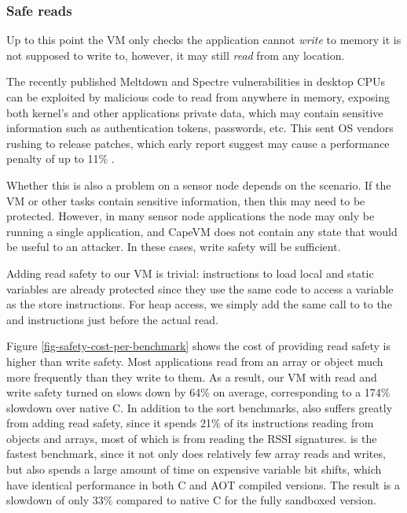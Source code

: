 \subsubsection{Safe reads}
Up to this point the VM only checks the application cannot \emph{write} to memory it is not supposed to write to, however, it may still \emph{read} from any location.

The recently published Meltdown and Spectre vulnerabilities in desktop CPUs can be exploited by malicious code to read from anywhere in memory, exposing both kernel's and other applications private data, which may contain sensitive information such as authentication tokens, passwords, etc. This sent OS vendors rushing to release patches, which early report suggest may cause a performance penalty of up to 11\% \cite{Simakov:2018wp}.

Whether this is also a problem on a sensor node depends on the scenario. If the VM or other tasks contain sensitive information, then this may need to be protected. However, in many sensor node applications the node may only be running a single application, and CapeVM does not contain any state that would be useful to an attacker. In these cases, write safety will be sufficient.

Adding read safety to our VM is trivial: instructions to load local and static variables are already protected since they use the same code to access a variable as the store instructions. For heap access, we simply add the same call to  to the  and  instructions just before the actual read.

Figure \ref{fig-safety-cost-per-benchmark} shows the cost of providing read safety is higher than write safety. Most applications read from an array or object much more frequently than they write to them. As a result, our VM with read and write safety turned on slows down by 64\% on average, corresponding to a 174\% slowdown over native C. In addition to the sort benchmarks,  also suffers greatly from adding read safety, since it spends 21\% of its instructions reading from objects and arrays, most of which is from reading the RSSI signatures.  is the fastest benchmark, since it not only does relatively few array reads and writes, but also spends a large amount of time on expensive variable bit shifts, which have identical performance in both C and AOT compiled versions. The result is a slowdown of only 33\% compared to native C for the fully sandboxed version.

